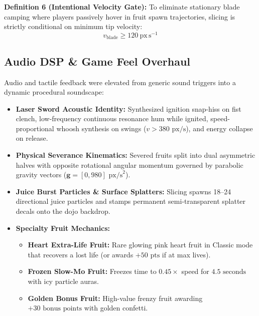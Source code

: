\documentclass[11pt,a4paper]{article}
\begin{document}
\begin{FormulaCard}
\textbf{\color{NavyPrimary}Definition 6 (Intentional Velocity Gate):} To eliminate stationary blade camping where players passively hover in fruit spawn trajectories, slicing is strictly conditional on minimum tip velocity:
{\large
\begin{equation}
v_{\mathrm{blade}} \ge 120\ \mathrm{px\,s^{-1}}
\label{eq:min_velocity}
\end{equation}
}
\end{FormulaCard}

\subsection{Audio DSP \& Game Feel Overhaul}
Audio and tactile feedback were elevated from generic sound triggers into a dynamic procedural soundscape:
\begin{itemize}[leftmargin=1.5em, itemsep=2pt, topsep=2pt]
  \item \textbf{Laser Sword Acoustic Identity:} Synthesized ignition snap-hiss on fist clench, low-frequency continuous resonance hum while ignited, speed-proportional whoosh synthesis on swings ($v > 380\text{ px/s}$), and energy collapse on release.
  \item \textbf{Physical Severance Kinematics:} Severed fruits split into dual asymmetric halves with opposite rotational angular momentum governed by parabolic gravity vectors ($\mathbf{g} = [0, 980]\text{ px/s}^2$).
  \item \textbf{Juice Burst Particles \& Surface Splatters:} Slicing spawns 18--24 directional juice particles and stamps permanent semi-transparent splatter decals onto the dojo backdrop.
  \item \textbf{Specialty Fruit Mechanics:}
    \begin{itemize}[leftmargin=1.2em, itemsep=1pt]
      \item \textbf{Heart Extra-Life Fruit:} Rare glowing pink heart fruit in Classic mode that recovers a lost life (or awards $+50\text{ pts}$ if at max lives).
      \item \textbf{Frozen Slow-Mo Fruit:} Freezes time to $0.45\times$ speed for $4.5\text{ seconds}$ with icy particle auras.
      \item \textbf{Golden Bonus Fruit:} High-value frenzy fruit awarding $+30\text{ bonus points}$ with golden confetti.
    \end{itemize}
\end{itemize}
\end{document}
